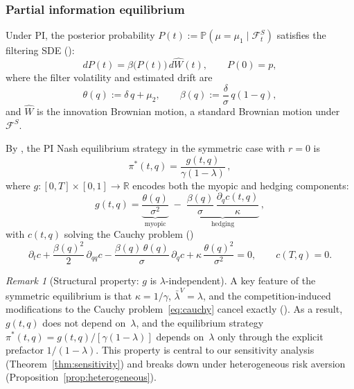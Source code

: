 \documentclass[12pt]{article}
\theoremstyle{remark}
\newtheorem{remark}[theorem]{Remark}
\theoremstyle{definition}
\newcommand{\Prob}{\mathbb{P}}
\newcommand{\R}{\mathbb{R}}
\newcommand{\What}{\widehat{W}}
\begin{document}
\subsubsection{Partial information equilibrium}

Under PI, the posterior probability
$P(t) := \Prob(\mu = \mu_1 \mid \mathcal{F}^S_t)$
satisfies the filtering SDE
(\citealt[Lemma~3.2]{HuangSun2025}):
\begin{equation}\label{eq:filter}
  dP(t) = \beta\bigl(P(t)\bigr)\,d\What(t),
  \qquad P(0) = p,
\end{equation}
where the filter volatility and estimated drift are
\begin{equation}\label{eq:theta_beta}
  \theta(q) := \delta\,q + \mu_2,
  \qquad
  \beta(q) := \frac{\delta}{\sigma}\,q(1-q),
\end{equation}
and $\What$ is the innovation Brownian motion, a standard Brownian motion
under $\mathcal{F}^S$.

By \citet[Theorem~3.2, Remark~3.7]{HuangSun2025}, the PI Nash
equilibrium strategy in the symmetric case with $r = 0$ is
\begin{equation}\label{eq:piPI}
  \pi^*(t,q) = \frac{g(t,q)}{\gamma(1-\lambda)}\,,
\end{equation}
where $g\colon [0,T] \times [0,1] \to \R$ encodes both the myopic and
hedging components:
\begin{equation}\label{eq:g_decomp}
  g(t,q)
  = \underbrace{\frac{\theta(q)}{\sigma^2}}_{\text{myopic}}
  \;-\; \underbrace{\frac{\beta(q)}{\sigma}\,
    \frac{\partial_q c(t,q)}{\kappa}}_{\text{hedging}}\,,
\end{equation}
with $c(t,q)$ solving the Cauchy problem
(\citealt[Lemma~3.3, Eq.~(3.27)]{HuangSun2025})
\begin{equation}\label{eq:cauchy}
  \partial_t c + \frac{\beta(q)^2}{2}\,\partial_{qq} c
  - \frac{\beta(q)\,\theta(q)}{\sigma}\,\partial_q c
  + \kappa\,\frac{\theta(q)^2}{\sigma^2} = 0,
  \qquad c(T,q) = 0.
\end{equation}

\begin{remark}[Structural property: $g$ is $\lambda$-independent]
\label{rem:g_indep}
A key feature of the symmetric equilibrium is that $\kappa = 1/\gamma$,
$\bar{\lambda}^V = \lambda$, and the competition-induced modifications to
the Cauchy problem~\eqref{eq:cauchy} cancel exactly
(\citealt[Remark~3.7]{HuangSun2025}).
As a result, $g(t,q)$ does not depend on~$\lambda$, and the equilibrium
strategy $\pi^*(t,q) = g(t,q)/[\gamma(1-\lambda)]$ depends on~$\lambda$
only through the explicit prefactor $1/(1-\lambda)$.
This property is central to our sensitivity analysis
(Theorem~\ref{thm:sensitivity}) and breaks down under heterogeneous
risk aversion (Proposition~\ref{prop:heterogeneous}).
\end{remark}
\end{document}
